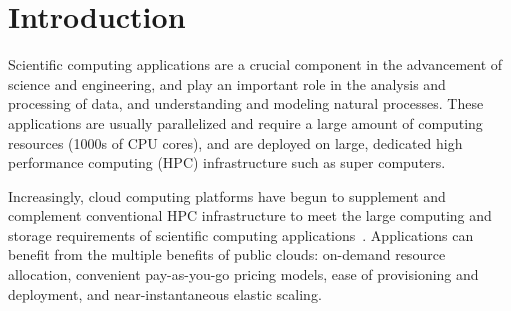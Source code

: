 \vspace*{\largesubsecspace}
\section{Introduction}
\label{sec:intro}








Scientific computing applications are a crucial component in the advancement of science and engineering, and play an important role in the analysis and processing of data, and understanding and modeling natural processes. 
These applications are usually parallelized and require a large amount of computing resources (1000s of CPU cores), and are deployed on large, dedicated high performance computing (HPC) infrastructure such as super computers. 

Increasingly, cloud computing platforms have begun to supplement and complement conventional HPC  infrastructure  to meet the large computing and storage requirements of scientific computing applications~\cite{buyya-hpc-survey}. 
%
Applications can benefit from the multiple benefits of public clouds: on-demand resource allocation, convenient pay-as-you-go pricing models, ease of provisioning and deployment, and near-instantaneous elastic scaling. 

